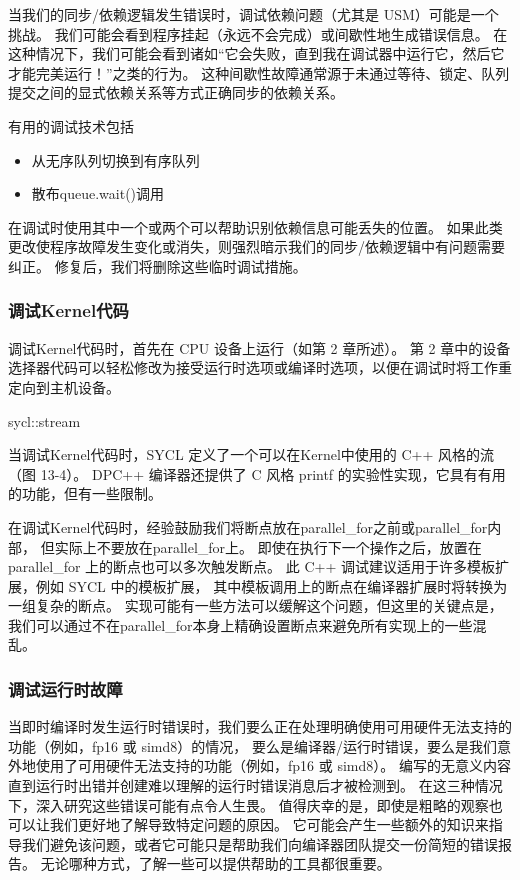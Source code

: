 当我们的同步/依赖逻辑发生错误时，调试依赖问题（尤其是 USM）可能是一个挑战。 
我们可能会看到程序挂起（永远不会完成）或间歇性地生成错误信息。 
在这种情况下，我们可能会看到诸如“它会失败，直到我在调试器中运行它，然后它才能完美运行！”之类的行为。 
这种间歇性故障通常源于未通过等待、锁定、队列提交之间的显式依赖关系等方式正确同步的依赖关系。

有用的调试技术包括

\begin{itemize}
	\item 从无序队列切换到有序队列

	\item 散布queue.wait()调用
\end{itemize}

在调试时使用其中一个或两个可以帮助识别依赖信息可能丢失的位置。 
如果此类更改使程序故障发生变化或消失，则强烈暗示我们的同步/依赖逻辑中有问题需要纠正。 
修复后，我们将删除这些临时调试措施。

\subsubsection{调试Kernel代码}
调试Kernel代码时，首先在 CPU 设备上运行（如第 2 章所述）。 
第 2 章中的设备选择器代码可以轻松修改为接受运行时选项或编译时选项，以便在调试时将工作重定向到主机设备。

{\color{red} sycl::stream}

当调试Kernel代码时，SYCL 定义了一个可以在Kernel中使用的 C++ 风格的流（图 13-4）。 
DPC++ 编译器还提供了 C 风格 printf 的实验性实现，它具有有用的功能，但有一些限制。

在调试Kernel代码时，经验鼓励我们将断点放在parallel\_for之前或parallel\_for内部，
但实际上不要放在parallel\_for上。 即使在执行下一个操作之后，放置在parallel\_for 上的断点也可以多次触发断点。 
此 C++ 调试建议适用于许多模板扩展，例如 SYCL 中的模板扩展，
其中模板调用上的断点在编译器扩展时将转换为一组复杂的断点。 
实现可能有一些方法可以缓解这个问题，但这里的关键点是，
我们可以通过不在parallel\_for本身上精确设置断点来避免所有实现上的一些混乱。

\subsubsection{调试运行时故障}
当即时编译时发生运行时错误时，我们要么正在处理明确使用可用硬件无法支持的功能（例如，fp16 或 simd8）的情况，
要么是编译器/运行时错误，要么是我们意外地使用了可用硬件无法支持的功能（例如，fp16 或 simd8）。 
编写的无意义内容直到运行时出错并创建难以理解的运行时错误消息后才被检测到。 
在这三种情况下，深入研究这些错误可能有点令人生畏。 
值得庆幸的是，即使是粗略的观察也可以让我们更好地了解导致特定问题的原因。 
它可能会产生一些额外的知识来指导我们避免该问题，或者它可能只是帮助我们向编译器团队提交一份简短的错误报告。 
无论哪种方式，了解一些可以提供帮助的工具都很重要。

